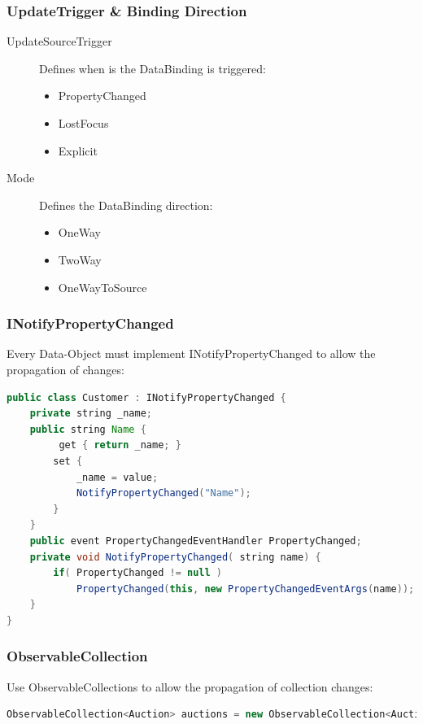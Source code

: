 \documentclass[10pt]{article}
\begin{document}
\subsubsection{UpdateTrigger \& Binding Direction}
\begin{description}
	\item[UpdateSourceTrigger] Defines when is the DataBinding is triggered:
		\begin{itemize}
			\item PropertyChanged
			\item LostFocus
			\item Explicit
		\end{itemize}
	\item[Mode] Defines the DataBinding direction:
		\begin{itemize}
			\item OneWay
			\item TwoWay
			\item OneWayToSource
		\end{itemize}
\end{description}
\subsubsection{INotifyPropertyChanged}
Every Data-Object must implement INotifyPropertyChanged to allow the
propagation of changes:
\begin{lstlisting}[language=Java, caption=INotifyPropertyChanged, style=JavaStyle]
public class Customer : INotifyPropertyChanged {
	private string _name;
	public string Name {
		 get { return _name; }
		set {
			_name = value;
			NotifyPropertyChanged("Name");
		}
	}
	public event PropertyChangedEventHandler PropertyChanged;
	private void NotifyPropertyChanged( string name) {
		if( PropertyChanged != null )
			PropertyChanged(this, new PropertyChangedEventArgs(name));
	}
}
\end{lstlisting}
\subsubsection{ObservableCollection}
Use ObservableCollections to allow the propagation of collection changes:
\begin{lstlisting}[language=Java, caption=ObservableCollection, style=JavaStyle]
ObservableCollection<Auction> auctions = new ObservableCollection<Auction>();
\end{lstlisting}
\end{document}
